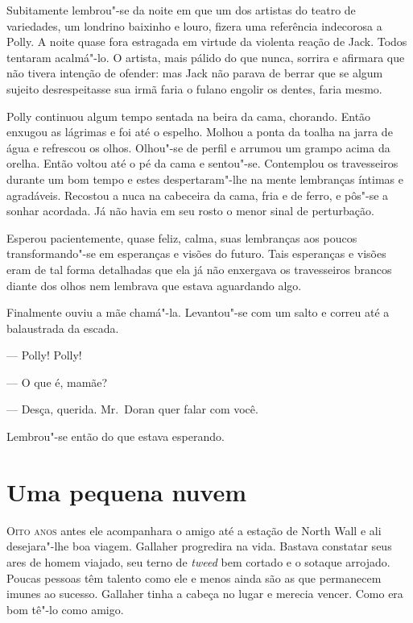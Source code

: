 Subitamente lembrou"-se da noite em que um dos artistas do teatro de variedades,
um londrino baixinho e louro, fizera uma referência indecorosa a Polly.  A
noite quase fora estragada em virtude da violenta reação de Jack.  Todos
tentaram acalmá"-lo.  O artista, mais pálido do que nunca, sorrira e afirmara
que não tivera intenção de ofender: mas Jack não parava de berrar que se algum
sujeito desrespeitasse sua irmã faria o fulano engolir os dentes, faria mesmo.

\smallskip

\noindent\dotfill

\smallskip

Polly continuou algum tempo sentada na beira da cama, chorando.  Então enxugou
as lágrimas e foi até o espelho.  Molhou a ponta da toalha na jarra de água e
refrescou os olhos.  Olhou"-se de perfil e arrumou um grampo acima da orelha.
Então voltou até o pé da cama e sentou"-se.  Contemplou os travesseiros durante
um bom tempo e estes despertaram"-lhe na mente lembranças íntimas e agradáveis.
Recostou a nuca na cabeceira da cama, fria e de ferro, e pôs"-se a sonhar
acordada.  Já não havia em seu rosto o menor sinal de perturbação.

Esperou pacientemente, quase feliz, calma, suas lembranças aos poucos
transformando"-se em esperanças e visões do futuro.  Tais esperanças e visões
eram de tal forma detalhadas que ela já não enxergava os travesseiros brancos
diante dos olhos nem lembrava que estava aguardando algo.

Finalmente ouviu a mãe chamá"-la.  Levantou"-se com um salto e correu até a
balaustrada da escada.

--- Polly! Polly!

--- O que é, mamãe?

--- Desça, querida.  Mr.~Doran quer falar com você.

Lembrou"-se então do que estava esperando.


\chapter{Uma pequena nuvem}

\textsc{Oito anos} antes ele acompanhara o amigo até a estação de North Wall e
ali desejara"-lhe boa viagem.  Gallaher progredira na vida.  Bastava constatar
seus ares de homem viajado, seu terno de \textit{tweed} bem cortado e o sotaque
arrojado.  Poucas pessoas têm talento como ele e menos ainda são as que
permanecem imunes ao sucesso.  Gallaher tinha a cabeça no lugar e merecia
vencer.  Como era bom tê"-lo como amigo.

